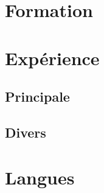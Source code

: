 \documentclass[11pt,a4paper,sans,french]{moderncv}        %
\title{}%
\begin{document}
\makecvtitle
\section{Formation}
\cventry{--}{}{}{}{}{}%
\cventry{--}{}{}{}{}{}%
\section{Expérience}
\subsection{Principale}
\cventry{--}{}{}{}{}{}%
\cventry{--}{}{}{}{}{}%
\subsection{Divers}
\cventry{--}{}{}{}{}{}%
\section{Langues}
\cvitemwithcomment{}{}{}%
\cvitemwithcomment{}{}{}%
\cvitemwithcomment{}{}{}%
\end{document}
